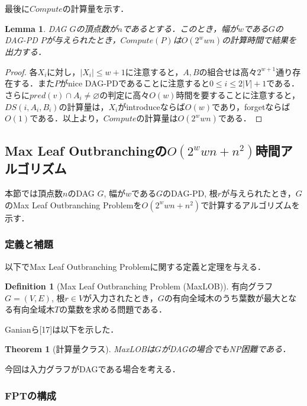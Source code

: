 \documentclass[master]{kuisthesis}		%
\theoremstyle{plain}
\newtheorem{theorem}{Theorem}
\newtheorem{lemma}{Lemma}
\theoremstyle{definition}
\newtheorem{definition*}{Definition}
\begin{document}
最後に$Compute$の計算量を示す．

\begin{lemma}
    DAG $G$の頂点数が$n$であるとする．このとき，幅が$w$である$G$のDAG-PD $P$が与えられたとき，$Compute(P)$は$O(2^wwn)$の計算時間で結果を出力する．
\end{lemma}

\begin{proof}
    各$X_i$に対し，$|X_i| \leq w+1$に注意すると，$A, B$の組合せは高々$2^{w+1}$通り存在する．また$P$がnice DAG-PDであることに注意すると$0 \leq i \leq 2|V|+1$である．さらに$pred(v) \cap A_i \neq \varnothing$の判定に高々$O(w)$時間を要することに注意すると，$DS(i, A_i, B_i)$の計算量は，$X_i$がintroduceならば$O(w)$であり，forgetならば$O(1)$である．以上より，$Compute$の計算量は$O(2^wwn)$である．
\end{proof}











\subsection{Max Leaf Outbranchingの$O(2^wwn+n^2)$時間アルゴリズム}

本節では頂点数$n$のDAG $G$, 幅が$w$である$G$のDAG-PD, 根$r$が与えられたとき，$G$のMax Leaf Outbranching Problemを$O(2^wwn+n^2)$で計算するアルゴリズムを示す．

\subsubsection{定義と補題}
以下でMax Leaf Outbranching Problemに関する定義と定理を与える．

\begin{definition*}[Max Leaf Outbranching Problem (MaxLOB)]
    有向グラフ $G=(V, E)$, 根$r \in V$が入力されたとき，$G$の有向全域木のうち葉数が最大となる有向全域木$T$の葉数を求める問題である．
\end{definition*}

Ganianら[17]は以下を示した．

\begin{theorem}[計算量クラス]
    MaxLOBは$G$がDAGの場合でもNP困難である．
\end{theorem}

今回は入力グラフがDAGである場合を考える．


\subsubsection{FPTの構成}
\end{document}
